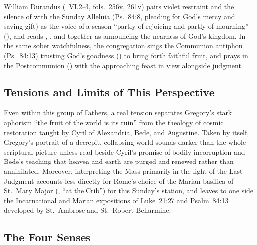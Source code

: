 William Durandus (~VI.2--3, fols.~256v, 261v) pairs violet restraint and the silence of  with the Sunday Alleluia (Ps.~84:8, pleading for God's mercy and saving gift) as the voice of a season ``partly of rejoicing and partly of mourning'' (), and reads , , and  together as announcing the nearness of God's kingdom. In the same sober watchfulness, the congregation sings the Communion antiphon (Ps.~84:13) trusting God's goodness () to bring forth faithful fruit, and prays in the Postcommunion () with the approaching feast in view alongside judgment.

\subsection{Tensions and Limits of This Perspective}

Even within this group of Fathers, a real tension separates Gregory's stark aphorism ``the fruit of the world is its ruin'' from the theology of cosmic restoration taught by Cyril of Alexandria, Bede, and Augustine. Taken by itself, Gregory's portrait of a decrepit, collapsing world sounds darker than the whole scriptural picture unless read beside Cyril's promise of bodily incorruption and Bede's teaching that heaven and earth are purged and renewed rather than annihilated. Moreover, interpreting the Mass primarily in the light of the Last Judgment accounts less directly for Rome's choice of the Marian basilica of St.~Mary Major (, ``at the Crib'') for this Sunday's station, and leaves to one side the Incarnational and Marian expositions of Luke~21:27 and Psalm~84:13 developed by St.~Ambrose and St.~Robert Bellarmine.

\subsection{The Four Senses}

